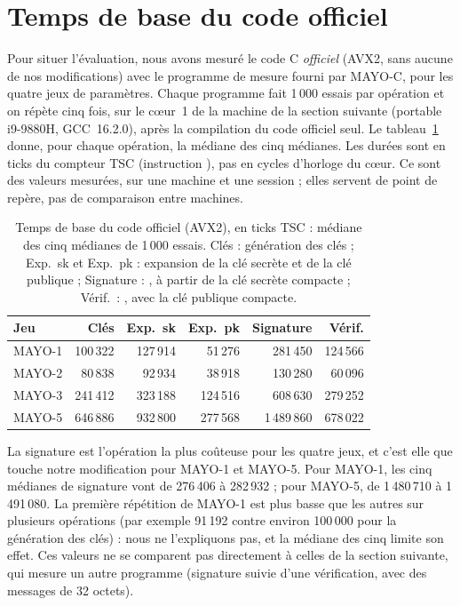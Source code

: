 \section{Temps de base du code officiel}\label{sec:base}
Pour situer l'évaluation, nous avons mesuré le code C \emph{officiel} (AVX2, sans aucune de nos modifications) avec le programme de mesure fourni par MAYO-C, pour les quatre jeux de paramètres. Chaque programme fait 1\,000 essais par opération et on répète cinq fois, sur le c\oe ur~1 de la machine de la section suivante (portable i9-9880H, GCC~16.2.0), après la compilation du code officiel seul. Le tableau~\ref{tab:base} donne, pour chaque opération, la médiane des cinq médianes. Les durées sont en ticks du compteur TSC (instruction ), pas en cycles d'horloge du c\oe ur. \F{} Ce sont des valeurs mesurées, sur une machine et une session ; elles servent de point de repère, pas de comparaison entre machines.
\begin{table}[ht]\centering\small
\caption[Temps de base du code officiel (AVX2), en ticks TSC]{Temps de base du code officiel (AVX2), en ticks TSC : médiane des cinq médianes de 1\,000 essais. Clés : génération des clés ; Exp.\ sk et Exp.\ pk : expansion de la clé secrète et de la clé publique ; Signature : , à partir de la clé secrète compacte ; Vérif.\ : , avec la clé publique compacte.}\label{tab:base}
\begin{tabular}{@{}lrrrrr@{}}\toprule
Jeu & Clés & Exp.\ sk & Exp.\ pk & Signature & Vérif.\\\midrule
MAYO-1 & 100\,322 & 127\,914 & 51\,276 & 281\,450 & 124\,566\\
MAYO-2 & 80\,838 & 92\,934 & 38\,918 & 130\,280 & 60\,096\\
MAYO-3 & 241\,412 & 323\,188 & 124\,516 & 608\,630 & 279\,252\\
MAYO-5 & 646\,886 & 932\,800 & 277\,568 & 1\,489\,860 & 678\,022\\\bottomrule
\end{tabular}
\end{table}
\F{} La signature est l'opération la plus coûteuse pour les quatre jeux, et c'est elle que touche notre modification pour MAYO-1 et MAYO-5. Pour MAYO-1, les cinq médianes de signature vont de 276\,406 à 282\,932 ; pour MAYO-5, de 1\,480\,710 à 1\,491\,080. La première répétition de MAYO-1 est plus basse que les autres sur plusieurs opérations (par exemple 91\,192 contre environ 100\,000 pour la génération des clés) : nous ne l'expliquons pas, et la médiane des cinq limite son effet. Ces valeurs ne se comparent pas directement à celles de la section suivante, qui mesure un autre programme (signature suivie d'une vérification, avec des messages de 32 octets).

